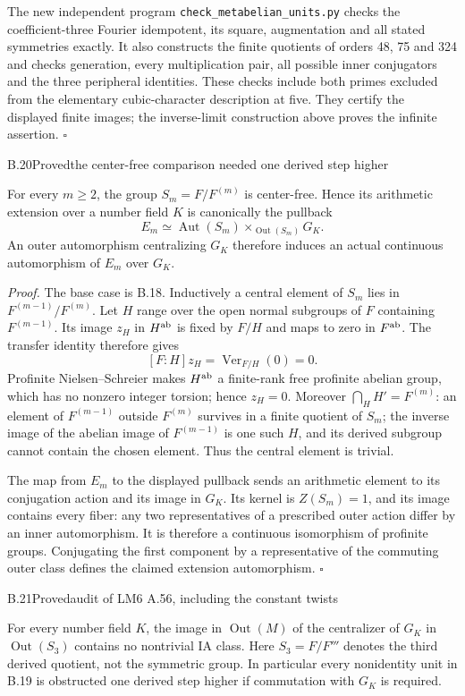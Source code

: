 The new independent program \texttt{check\_metabelian\_units.py}
checks the coefficient-three Fourier idempotent, its square,
augmentation and all stated symmetries exactly. It also constructs
the finite quotients of orders 48, 75 and 324 and checks generation,
every multiplication pair, all possible inner conjugators and the
three peripheral identities. These checks include both primes
excluded from the elementary cubic-character description at five.
They certify the displayed finite images; the inverse-limit
construction above proves the infinite assertion. \hfill$\square$

\begin{statement}{B.20}{Proved}{the center-free comparison needed one derived step higher}
\end{statement}
For every $m\ge2$, the group $S_m=F/F^{(m)}$ is center-free.
Hence its arithmetic extension over a number field $K$ is
canonically the pullback
\[
 E_m\simeq\operatorname{Aut}(S_m)
             \times_{\operatorname{Out}(S_m)}G_K.
\]
An outer automorphism centralizing $G_K$ therefore induces an
actual continuous automorphism of $E_m$ over $G_K$.

\emph{Proof.}
The base case is B.18. Inductively a central element of $S_m$
lies in $F^{(m-1)}/F^{(m)}$. Let $H$ range over the open normal
subgroups of $F$ containing $F^{(m-1)}$. Its image $z_H$ in
$H^{\rm ab}$ is fixed by $F/H$ and maps to zero in $F^{\rm ab}$.
The transfer identity therefore gives
\[
 [F:H]z_H=\operatorname{Ver}_{F/H}(0)=0.
\]
Profinite Nielsen--Schreier makes $H^{\rm ab}$ a finite-rank
free profinite abelian group, which has no nonzero integer
torsion; hence $z_H=0$.
Moreover $\bigcap_HH'=F^{(m)}$: an element of $F^{(m-1)}$
outside $F^{(m)}$ survives in a finite quotient of $S_m$;
the inverse image of the abelian image of $F^{(m-1)}$ is one
such $H$, and its derived subgroup cannot contain the chosen
element. Thus the central element is trivial.

The map from $E_m$ to the displayed pullback sends an arithmetic
element to its conjugation action and its image in $G_K$.
Its kernel is $Z(S_m)=1$, and its image contains every fiber:
any two representatives of a prescribed outer action differ by
an inner automorphism. It is therefore a continuous isomorphism
of profinite groups. Conjugating the first component by a
representative of the commuting outer class defines the claimed
extension automorphism. \hfill$\square$

\begin{statement}{B.21}{Proved}{audit of LM6 A.56, including the constant twists}
\citep{LiftSerre2007,LiftMilneCFT2020,LiftMilneLEC2013}
\end{statement}
For every number field $K$, the image in $\operatorname{Out}(M)$
of the centralizer of $G_K$ in $\operatorname{Out}(S_3)$ contains
no nontrivial IA class. Here $S_3=F/F'''$ denotes the third
derived quotient, not the symmetric group. In particular every
nonidentity unit in B.19 is obstructed one derived step higher
if commutation with $G_K$ is required.

